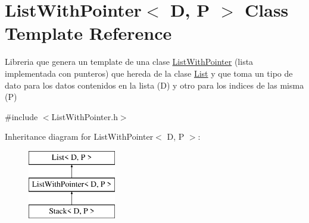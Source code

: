 \hypertarget{class_list_with_pointer}{\section{List\+With\+Pointer$<$ D, P $>$ Class Template Reference}
\label{class_list_with_pointer}
}


Libreria que genera un template de una clase \hyperlink{class_list_with_pointer}{List\+With\+Pointer} (lista implementada con punteros) que hereda de la clase \hyperlink{class_list}{List} y que toma un tipo de dato para los datos contenidos en la lista (D) y otro para los indices de las misma (P)  




{\ttfamily \#include $<$List\+With\+Pointer.\+h$>$}

Inheritance diagram for List\+With\+Pointer$<$ D, P $>$\+:\begin{figure}[H]
\begin{center}
\leavevmode
\includegraphics[height=3.000000cm]{class_list_with_pointer}
\end{center}
\end{figure}
